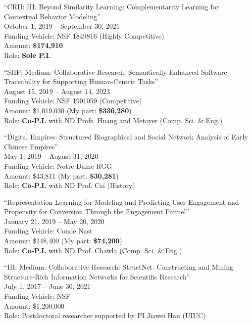 \documentclass[10pt]{article}
\newenvironment{myindentpar}[1]%
{\begin{list}{}%
         {\setlength{\leftmargin}{#1}}%
         \item[]%
}
{\end{list}}
\newcounter{list}
\begin{document}
\begin{myindentpar}{0.75cm}

\hspace{-0.75cm}``CRII: III: Beyond Similarity Learning: Complementarity Learning for Contextual Behavior Modeling''\\
October 1, 2019 -- September 30, 2021 \\
Funding Vehicle: NSF 1849816 (Highly Competitive) \\
Amount: \textbf{\$174,910} \\
Role: \textbf{Sole P.I.}

\hspace{-0.75cm}``SHF: Medium: Collaborative Research: Semantically-Enhanced Software Traceability for Supporting Human-Centric Tasks''\\
August 15, 2019 -- August 14, 2023 \\
Funding Vehicle: NSF 1901059 (Competitive) \\
Amount: \$1,019,030 (My part: \textbf{\$336,280}) \\
Role: \textbf{Co-P.I.} with ND Profs. Huang and Metoyer (Comp. Sci. \& Eng.)

\hspace{-0.75cm}``Digital Empires: Structured Biographical and Social Network Analysis of Early Chinese Empires''\\
May 1, 2019 -- August 31, 2020 \\
Funding Vehicle: Notre Dame RGG \\
Amount: \$43,811 (My part: \textbf{\$30,281}) \\
Role: \textbf{Co-P.I.} with ND Prof. Cai (History)

\hspace{-0.75cm}``Representation Learning for Modeling and Predicting User Engagement and Propensity for Conversion Through the Engagement Funnel''\\
January 21, 2019 -- May 20, 2020 \\
Funding Vehicle: Conde Nast \\
Amount: \$148,400 (My part: \textbf{\$74,200}) \\
Role: \textbf{Co-P.I.} with ND Prof. Chawla (Comp. Sci. \& Eng.)

\hspace{-0.75cm}``III: Medium: Collaborative Research: StructNet: Constructing and Mining Structure-Rich Information Networks for Scientific Research''\\
July 1, 2017 -- June 30, 2021 \\
Funding Vehicle: NSF \\
Amount: \$1,200,000 \\
Role: Postdoctoral researcher supported by PI Jiawei Han (UIUC)


\end{myindentpar}
\end{document}
